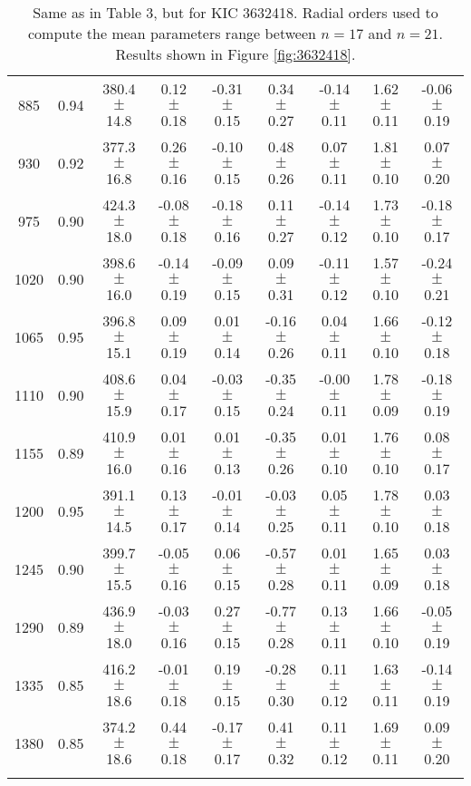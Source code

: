 \documentclass[twocolumn]{aastex61}%
\begin{document}
\begin{table*}[ht]
\begin{tabular}{ccc|ccccc|c}
885 & 0.94 & 380.4 $\pm$ 14.8 & 0.12 $\pm$ 0.18 & -0.31 $\pm$ 0.15 & 0.34 $\pm$ 0.27 & -0.14 $\pm$ 0.11 & 1.62 $\pm$ 0.11 & -0.06 $\pm$ 0.19\\
930 & 0.92 & 377.3 $\pm$ 16.8 & 0.26 $\pm$ 0.16 & -0.10 $\pm$ 0.15 & 0.48 $\pm$ 0.26 & 0.07 $\pm$ 0.11 & 1.81 $\pm$ 0.10 & 0.07 $\pm$ 0.20\\
975 & 0.90 & 424.3 $\pm$ 18.0 & -0.08 $\pm$ 0.18 & -0.18 $\pm$ 0.16 & 0.11 $\pm$ 0.27 & -0.14 $\pm$ 0.12 & 1.73 $\pm$ 0.10 & -0.18 $\pm$ 0.17\\
1020 & 0.90 & 398.6 $\pm$ 16.0 & -0.14 $\pm$ 0.19 & -0.09 $\pm$ 0.15 & 0.09 $\pm$ 0.31 & -0.11 $\pm$ 0.12 & 1.57 $\pm$ 0.10 & -0.24 $\pm$ 0.21\\
1065 & 0.95 & 396.8 $\pm$ 15.1 & 0.09 $\pm$ 0.19 & 0.01 $\pm$ 0.14 & -0.16 $\pm$ 0.26 & 0.04 $\pm$ 0.11 & 1.66 $\pm$ 0.10 & -0.12 $\pm$ 0.18\\
1110 & 0.90 & 408.6 $\pm$ 15.9 & 0.04 $\pm$ 0.17 & -0.03 $\pm$ 0.15 & -0.35 $\pm$ 0.24 & -0.00 $\pm$ 0.11 & 1.78 $\pm$ 0.09 & -0.18 $\pm$ 0.19\\
1155 & 0.89 & 410.9 $\pm$ 16.0 & 0.01 $\pm$ 0.16 & 0.01 $\pm$ 0.13 & -0.35 $\pm$ 0.26 & 0.01 $\pm$ 0.10 & 1.76 $\pm$ 0.10 & 0.08 $\pm$ 0.17\\
1200 & 0.95 & 391.1 $\pm$ 14.5 & 0.13 $\pm$ 0.17 & -0.01 $\pm$ 0.14 & -0.03 $\pm$ 0.25 & 0.05 $\pm$ 0.11 & 1.78 $\pm$ 0.10 & 0.03 $\pm$ 0.18\\
1245 & 0.90 & 399.7 $\pm$ 15.5 & -0.05 $\pm$ 0.16 & 0.06 $\pm$ 0.15 & -0.57 $\pm$ 0.28 & 0.01 $\pm$ 0.11 & 1.65 $\pm$ 0.09 & 0.03 $\pm$ 0.18\\
1290 & 0.89 & 436.9 $\pm$ 18.0 & -0.03 $\pm$ 0.16 & 0.27 $\pm$ 0.15 & -0.77 $\pm$ 0.28 & 0.13 $\pm$ 0.11 & 1.66 $\pm$ 0.10 & -0.05 $\pm$ 0.19\\
1335 & 0.85 & 416.2 $\pm$ 18.6 & -0.01 $\pm$ 0.18 & 0.19 $\pm$ 0.15 & -0.28 $\pm$ 0.30 & 0.11 $\pm$ 0.12 & 1.63 $\pm$ 0.11 & -0.14 $\pm$ 0.19\\
1380 & 0.85 & 374.2 $\pm$ 18.6 & 0.44 $\pm$ 0.18 & -0.17 $\pm$ 0.17 & 0.41 $\pm$ 0.32 & 0.11 $\pm$ 0.12 & 1.69 $\pm$ 0.11 & 0.09 $\pm$ 0.20\\\vspace{-0.35cm}
\end{tabular}
\caption{Same as in Table 3, but for KIC 3632418. Radial orders used to compute the mean parameters range between $n=17$ and $n=21$. Results shown in Figure \ref{fig:3632418}.}\label{tab:3632418}\vspace{-0.2cm}
\end{table*}
\end{document}
